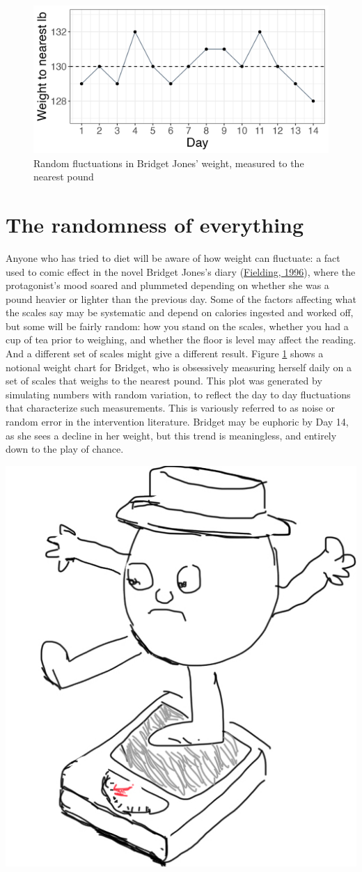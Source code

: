 \documentclass{krantz}
\begin{document}
\begin{figure}
\includegraphics[width=0.75\linewidth]{images_bw/weightplot} \caption{Random fluctuations in Bridget Jones' weight, measured to the nearest pound}\label{fig:weightplot-1}
\end{figure}

\hypertarget{the-randomness-of-everything}{%
\section{The randomness of everything}\label{the-randomness-of-everything}}

Anyone who has tried to diet will be aware of how weight can fluctuate: a fact used to comic effect in the novel Bridget Jones's diary (\protect\hyperlink{ref-fielding1996}{Fielding, 1996}), where the protagonist's mood soared and plummeted depending on whether she was a pound heavier or lighter than the previous day. Some of the factors affecting what the scales say may be systematic and depend on calories ingested and worked off, but some will be fairly random: how you stand on the scales, whether you had a cup of tea prior to weighing, and whether the floor is level may affect the reading. And a different set of scales might give a different result. Figure \ref{fig:weightplot-1} shows a notional weight chart for Bridget, who is obsessively measuring herself daily on a set of scales that weighs to the nearest pound. This plot was generated by simulating numbers with random variation, to reflect the day to day fluctuations that characterize such measurements. This is variously referred to as noise or random error in the intervention literature. Bridget may be euphoric by Day 14, as she sees a decline in her weight, but this trend is meaningless, and entirely down to the play of chance.

\begin{center}

\includegraphics[width=0.25\linewidth]{images_bw/scales_man} 
\end{center}
\end{document}

